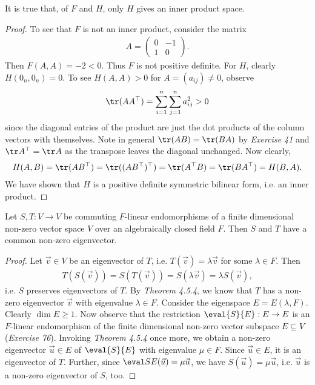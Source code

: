 \documentclass{article}
\begin{document}
\begin{claim*}[1c]
	It is true that, of $F$ and $H$, only $H$ gives an inner product space.
	\begin{proof}
		To see that $F$ is not an inner product, consider the matrix
		\begin{align*}
			A=\begin{pmatrix}
				0 & -1 \\
				1 & 0
			\end{pmatrix}.
		\end{align*}
		Then $F(A,A)=-2<0$. Thus $F$ is not positive definite. For $H$, clearly
		$H(0_n,0_n)=0$. To see $H(A,A)>0$ for $A=(a_{ij})\not=0$, observe
		\begin{align*}
			\tr(AA^\top) = \sum_{i=1}^n \sum_{j=1}^n a_{ij}^2 > 0
		\end{align*}
		since the diagonal entries of the product are just the dot products of the column
		vectors with themselves. Note in general $\tr(AB)=\tr(BA)$ by \emph{Exercise 41}
		and $\tr A^\top=\tr A$ as the transpose leaves the diagonal unchanged. Now clearly,
		\begin{align*}
			H(A,B) = \tr(AB^\top) = \tr((AB^\top)^\top)  = \tr(A^\top B) = \tr(BA^\top) = H(B,A).
		\end{align*}
		We have shown that $H$ is a positive definite symmetric bilinear form, i.e. an inner
		product.
	\end{proof}
\end{claim*}

\begin{claim*}[2]
	Let $S,T:V\to V$ be commuting $F$-linear endomorphisms of a finite dimensional non-zero vector space $V$ over an
	algebraically closed field $F$. Then $S$ and $T$ have a common non-zero eigenvector.
	\begin{proof}
		Let $\vec v\in V$ be an eigenvector of $T$, i.e. $T(\vec v) = \lambda \vec v$ for some $\lambda\in F$.
		Then
		\begin{align*}
			T(S(\vec v)) = S(T(\vec v)) = S(\lambda\vec v) = \lambda S(\vec v),
		\end{align*}
		i.e. $S$ preserves eigenvectors of $T$. By \emph{Theorem 4.5.4}, we know that $T$ has
		a non-zero eigenvector $\vec v$ with eigenvalue $\lambda\in F$. Consider the eigenspace
		$E=E(\lambda, F)$. Clearly $\dim E \geq 1$. Now observe that the restriction
		$\eval{S}{E}:E\to E$ is an $F$-linear endomorphism of the finite dimensional non-zero vector
		subspace $E\subseteq V$ (\emph{Exercise 76}).
		Invoking \emph{Theorem 4.5.4} once more, we obtain a non-zero eigenvector $\vec u\in E$ of $\eval{S}{E}$
		with eigenvalue $\mu\in F$.
		Since $\vec u\in E$, it is an eigenvector of $T$. Further, since $\eval SE(\vec u) = \mu\vec u$,
		we have $S(\vec u)=\mu \vec u$, i.e. $\vec u$ is a non-zero eigenvector of $S$, too.
	\end{proof}
\end{claim*}
\end{document}

